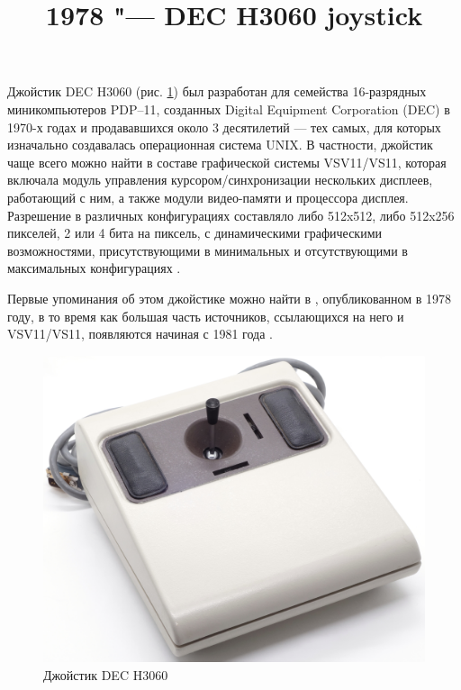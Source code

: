 \documentclass[11pt, a4paper]{article}
\begin{document}
\title{1978 "--- DEC H3060 joystick}
\date{}
\maketitle
{}

Джойстик DEC H3060 (рис. \ref{fig:DecJoystickPic}) был разработан для семейства 16-разрядных миникомпьютеров PDP–11, созданных Digital Equipment Corporation (DEC) в 1970-х годах и продававшихся около 3 десятилетий --- тех самых, для которых изначально создавалась операционная система UNIX. В частности, джойстик чаще всего можно найти в составе графической системы VSV11/VS11, которая включала модуль управления курсором/синхронизации нескольких дисплеев, работающий с ним, а также модули видео-памяти и процессора дисплея. Разрешение в различных конфигурациях составляло либо 512x512, либо 512x256 пикселей, 2 или 4 бита на пиксель, с динамическими графическими возможностями, присутствующими в минимальных и отсутствующими в максимальных конфигурациях \cite{joystick}.

Первые упоминания об этом джойстике можно найти в \cite{fiche}, опубликованном в 1978 году, в то время как большая часть источников, ссылающихся на него и VSV11/VS11, появляются начиная с 1981 года \cite{flyer, vsv11}.

\begin{figure}[h]
   \centering
    \includegraphics[scale=0.53]{1978_dec_h3060_joystick/pic_30.jpg}
    \caption{Джойстик DEC H3060}
    \label{fig:DecJoystickPic}
\end{figure}
\end{document}
